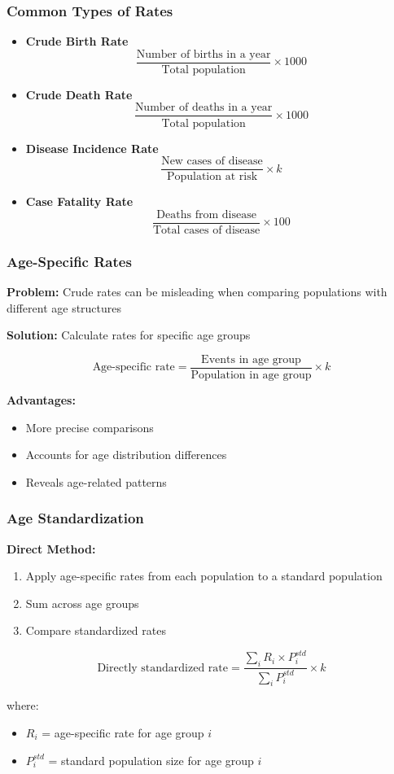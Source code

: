 \documentclass{beamer}
\begin{document}
\begin{frame}
\frametitle{Common Types of Rates}
\begin{itemize}
\item \textbf{Crude Birth Rate}
  $$\frac{\text{Number of births in a year}}{\text{Total population}} \times 1000$$

\item \textbf{Crude Death Rate}
  $$\frac{\text{Number of deaths in a year}}{\text{Total population}} \times 1000$$

\item \textbf{Disease Incidence Rate}
  $$\frac{\text{New cases of disease}}{\text{Population at risk}} \times k$$

\item \textbf{Case Fatality Rate}
  $$\frac{\text{Deaths from disease}}{\text{Total cases of disease}} \times 100$$
\end{itemize}
\end{frame}

\begin{frame}
\frametitle{Age-Specific Rates}
\textbf{Problem:} Crude rates can be misleading when comparing populations with different age structures

\vspace{0.5cm}
\textbf{Solution:} Calculate rates for specific age groups

$$\text{Age-specific rate} = \frac{\text{Events in age group}}{\text{Population in age group}} \times k$$

\vspace{0.5cm}
\textbf{Advantages:}
\begin{itemize}
\item More precise comparisons
\item Accounts for age distribution differences
\item Reveals age-related patterns
\end{itemize}
\end{frame}

\begin{frame}
\frametitle{Age Standardization}
\textbf{Direct Method:}
\begin{enumerate}
\item Apply age-specific rates from each population to a standard population
\item Sum across age groups
\item Compare standardized rates
\end{enumerate}

\vspace{0.5cm}
$$\text{Directly standardized rate} = \frac{\sum_{i} R_i \times P_{i}^{std}}{\sum_{i} P_{i}^{std}} \times k$$

where:
\begin{itemize}
\item $R_i$ = age-specific rate for age group $i$
\item $P_{i}^{std}$ = standard population size for age group $i$
\end{itemize}
\end{frame}
\end{document}
